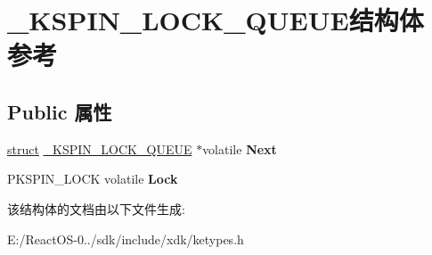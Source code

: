 \hypertarget{struct___k_s_p_i_n___l_o_c_k___q_u_e_u_e}{}\section{\+\_\+\+K\+S\+P\+I\+N\+\_\+\+L\+O\+C\+K\+\_\+\+Q\+U\+E\+U\+E结构体 参考}
\label{struct___k_s_p_i_n___l_o_c_k___q_u_e_u_e}
\subsection*{Public 属性}
\begin{DoxyCompactItemize}
\item 
\mbox{\label{struct___k_s_p_i_n___l_o_c_k___q_u_e_u_e_a19dfd3f358ac91d560dbc1915e9cb021}} 
\hyperlink{interfacestruct}{struct} \hyperlink{struct___k_s_p_i_n___l_o_c_k___q_u_e_u_e}{\+\_\+\+K\+S\+P\+I\+N\+\_\+\+L\+O\+C\+K\+\_\+\+Q\+U\+E\+UE} $\ast$volatile {\bfseries Next}
\item 
\mbox{\label{struct___k_s_p_i_n___l_o_c_k___q_u_e_u_e_a2ee335daefce5c55d399789747c3772c}} 
P\+K\+S\+P\+I\+N\+\_\+\+L\+O\+CK volatile {\bfseries Lock}
\end{DoxyCompactItemize}


该结构体的文档由以下文件生成\+:\begin{DoxyCompactItemize}
\item 
E\+:/\+React\+O\+S-\/0../sdk/include/xdk/ketypes.\+h\end{DoxyCompactItemize}
